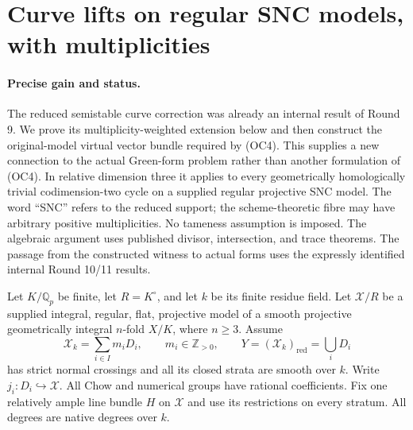 \section{Curve lifts on regular SNC models, with multiplicities}
\label{r12n:section}

\paragraph{Precise gain and status.}
The reduced semistable curve correction was already an internal result
of Round 9.  We prove its multiplicity-weighted extension below and then
construct the original-model virtual vector bundle required by (OC4).
This supplies a new connection to the actual Green-form problem rather
than another formulation of (OC4).  In relative dimension three it
applies to every geometrically homologically trivial codimension-two
cycle on a supplied regular projective SNC model.  The word ``SNC''
refers to the reduced support; the scheme-theoretic fibre may have
arbitrary positive multiplicities.  No tameness assumption is imposed.
The algebraic argument uses published divisor, intersection, and trace
theorems.  The passage from the constructed witness to actual forms
uses the expressly identified internal Round 10/11 results.

Let $K/\mathbb Q_p$ be finite, let $R=K^\circ$, and let $k$ be its
finite residue field.  Let $\mathcal X/R$ be a supplied integral,
regular, flat, projective model of a smooth projective geometrically
integral $n$-fold $X/K$, where $n\geq3$.  Assume
\[
       \mathcal X_k=\sum_{i\in I}m_iD_i,\qquad m_i\in\mathbb Z_{>0},
       \qquad Y=(\mathcal X_k)_{\mathrm{red}}=\bigcup_iD_i
\tag{NL1}\label{r12n:fibre}
\]
has strict normal crossings and all its closed strata are smooth over
$k$.  Write $j_i:D_i\hookrightarrow\mathcal X$.  All Chow and numerical
groups have rational coefficients.  Fix one relatively ample line
bundle $H$ on $\mathcal X$ and use its restrictions on every stratum.
All degrees are native degrees over $k$.

